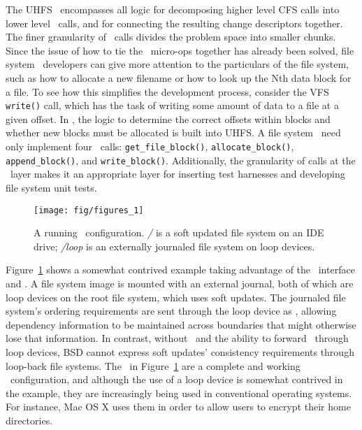 The UHFS \module\ encompasses all logic for decomposing higher level CFS calls
into lower level \LFS\ calls, and for connecting the resulting change descriptors
together. The finer granularity of \LFS\ calls divides the problem space into
smaller chunks. Since the issue of how to tie the \LFS\ micro-ops together has
already been solved, file system \module\ developers can give more attention to
the particulars of the file system, such as how to allocate a new filename or
how to look up the Nth data block for a file. To see how this simplifies the
development process, consider the VFS \texttt{write()} call, which has the task
of writing some amount of data to a file at a given offset. In \Kudos, the logic
to determine the correct offsets within blocks and whether new blocks must be
allocated is built into UHFS. A file system \module\ need only implement four
\LFS\ calls: \texttt{get\_file\_block()}, \texttt{allocate\_block()},
\texttt{append\_block()}, and \texttt{write\_block()}. Additionally, the
granularity of calls at the \LFS\ layer makes it an appropriate layer for
inserting test harnesses and developing file system unit tests.

\begin{figure}[tb]
  \centering
  \texttt{[image: fig/figures\_1]}
  \caption{A running \Kudos\ configuration. {\it/} is a soft updated
    file system on an IDE drive; {\it/loop} is an externally journaled
    file system on loop devices.}
  \label{fig:kfs-graph}
\end{figure}

Figure~\ref{fig:kfs-graph} shows a somewhat contrived example taking advantage
of the \LFS\ interface and \chdescs. A file system image is mounted with an
external journal, both of which are loop devices on the root file system, which
uses soft updates. The journaled file system's ordering requirements are sent
through the loop device as \chdescs, allowing dependency information to be
maintained across boundaries that might otherwise lose that information. In
contrast, without \chdescs\ and the ability to forward \chdescs\ through loop
devices, BSD cannot express soft updates' consistency requirements through
loop-back file systems. The \modules\ in Figure~\ref{fig:kfs-graph} are a
complete and working \Kudos\ configuration, and although the use of a loop
device is somewhat contrived in the example, they are increasingly being used in
conventional operating systems. For instance, Mac OS X uses them in order to
allow users to encrypt their home directories.
